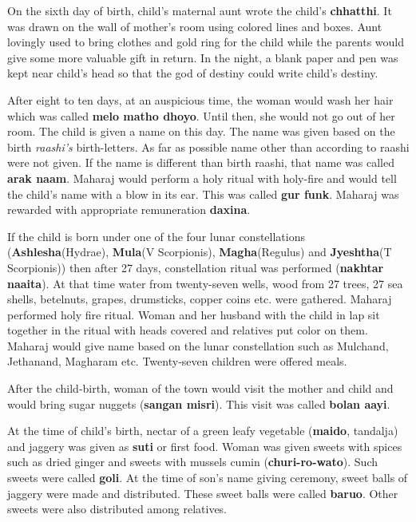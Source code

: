 On the sixth day of birth, child's maternal aunt wrote the child's
\textbf{chhatthi}. It was drawn on the wall of mother's room using colored
lines and boxes. Aunt lovingly used to bring clothes and gold ring for the
child while the parents would give some more valuable gift in return. In the
night, a blank paper and pen was kept near child's head so that the god of
destiny could write child's destiny.

After eight to ten days, at an auspicious time, the woman would wash her hair
which was called \textbf{melo matho dhoyo}. Until then, she would not go out of
her room. The child is given a name on this day. The name was given based on
the birth \textit{raashi's} birth-letters. As far as possible name other than
according to raashi were not given. If the name is different than birth raashi,
that name was called \textbf{arak naam}. Maharaj would perform a holy ritual
with holy-fire and would tell the child's name with a blow in its ear. This was
called \textbf{gur funk}. Maharaj was rewarded with appropriate remuneration
\textbf{daxina}.

If the child is born under one of the four lunar constellations
(\textbf{Ashlesha}(Hydrae), \textbf{Mula}(V Scorpionis),
\textbf{Magha}(Regulus) and \textbf{Jyeshtha}(T Scorpionis)) then after 27
days, constellation ritual was performed (\textbf{nakhtar naaita}). At that
time water from twenty-seven wells, wood from 27 trees, 27 sea shells, betelnuts,
grapes, drumsticks, copper coins etc. were gathered. Maharaj performed holy
fire ritual. Woman and her husband with the child in lap sit together in the
ritual with heads covered and relatives put color on them. Maharaj would give
name based on the lunar constellation such as Mulchand, Jethanand, Magharam
etc. Twenty-seven children were offered meals.

After the child-birth, woman of the town would visit the mother and child and
would bring sugar nuggets (\textbf{sangan misri}). This visit was called
\textbf{bolan aayi}.

At the time of child's birth, nectar of a green leafy vegetable
(\textbf{maido}, tandalja) and jaggery was given as \textbf{suti} or first
food. Woman was given sweets with spices such as dried ginger and sweets with
mussels cumin (\textbf{churi-ro-wato}). Such sweets were called \textbf{goli}.
At the time of son's name giving ceremony, sweet balls of jaggery were made and
distributed. These sweet balls were called \textbf{baruo}. Other sweets were
also distributed among relatives.

